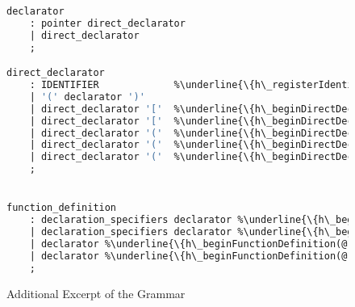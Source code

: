 \documentclass[12pt]{report}
\begin{document}
\begin{figure}
\caption{Additional Excerpt of the Grammar}
\label{hookGrammar}
\begin{lstlisting}[language=Caml, escapechar=\%]
declarator
	: pointer direct_declarator
	| direct_declarator
	;

direct_declarator
	: IDENTIFIER			 %\underline{\{h\_registerIdentifier(@\$);\}}%
	| '(' declarator ')'
	| direct_declarator '['  %\underline{\{h\_beginDirectDeclarator(@1);\}}% constant_expression ']'	 %\underline{\{h\_endDirectDeclarator(@\$);\}}%
	| direct_declarator '['  %\underline{\{h\_beginDirectDeclarator(@1);\}}% ']'						%\underline{\{h\_endDirectDeclarator(@\$);\}}%
	| direct_declarator '('  %\underline{\{h\_beginDirectDeclarator(@1);\}}% parameter_type_list ')'	%\underline{\{h\_endDirectDeclarator(@\$);\}}%
	| direct_declarator '('  %\underline{\{h\_beginDirectDeclarator(@1);\}}% identifier_list ')'		%\underline{\{h\_endDirectDeclarator(@\$);\}}%
	| direct_declarator '('  %\underline{\{h\_beginDirectDeclarator(@1);\}}% ')'						%\underline{\{h\_endDirectDeclarator(@\$);\}}%
	;


function_definition
	: declaration_specifiers declarator %\underline{\{h\_beginFunctionDefinition(@2);\}}% declaration_list compound_statement %\underline{\{endFunctionDefinition(@\$);\}}%
	| declaration_specifiers declarator %\underline{\{h\_beginFunctionDefinition(@2);\}}%} compound_statement %\underline{\{endFunctionDefinition(@\$);\}}%
	| declarator %\underline{\{h\_beginFunctionDefinition(@1);\}}% declaration_list compound_statement %\underline{\{endFunctionDefinition(@\$);\}}%
	| declarator %\underline{\{h\_beginFunctionDefinition(@1);\}}% compound_statement %\underline{\{endFunctionDefinition(@\$);\}}
	;
\end{lstlisting}
\end{figure}
\end{document}
